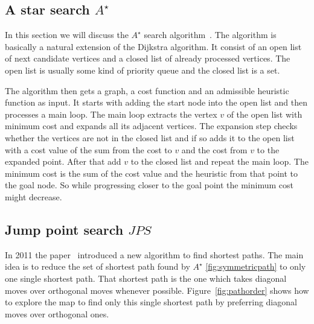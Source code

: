 \documentclass{article}
\begin{document}
    \subsection{A star search $A^\star$ }
    
    In this section we will discuss the $A^\star$ search algorithm~\cite{Astar}. The algorithm is basically a natural extension of the Dijkstra algorithm. It consist of an open list of next candidate vertices and a closed list of already processed vertices. The open list is usually some kind of priority queue and the closed list is a set.
    
    The algorithm then gets a graph, a cost function and an admissible heuristic function as input. It starts with adding the start node into the open list and then processes a main loop. The main loop extracts the vertex $v$ of the open list with minimum cost and expands all its adjacent vertices. The expansion step checks whether the vertices are not in the closed list and if so adds it to the open list with a cost value of the sum from the cost to $v$ and the cost from $v$ to the expanded point. After that add $v$ to the closed list and repeat the main loop. The minimum cost is the sum of the cost value and the heuristic from that point to the goal node. So while progressing closer to the goal point the minimum cost might decrease.
    
    \subsection{Jump point search $JPS$}
    
    In 2011 the paper~\cite{DBLP:conf/aaai/HaraborG11} introduced a new algorithm to find shortest paths. The main idea is to reduce the set of shortest path found by $A^\star$ \ref{fig:symmetricpath} to only one single shortest path. That shortest path is the one which takes diagonal moves over orthogonal moves whenever possible. Figure~\ref{fig:pathorder} shows how to explore the map to find only this single shortest path by preferring diagonal moves over orthogonal ones.
    
\end{document}

